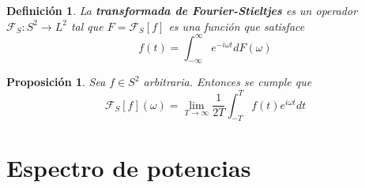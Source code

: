 \documentclass[12pt,letterpaper]{book}
\newtheorem{definicion}{Definición}[chapter]
\newtheorem{proposicion}[teorema]{Proposición}
\newcommand{\intR}{\int_{-\infty}^{\infty}}
\begin{document}
\begin{definicion}
La \textbf{transformada de Fourier-Stieltjes} es un  operador $\mathcal{F}_S:S^2\rightarrow L^2$ tal que $F = \mathcal{F}_S[f]$ es una función que satisface
\begin{equation}
f(t) = \intR e^{-i \omega t} dF(\omega)
\end{equation}
\end{definicion}

\begin{proposicion}
Sea $f \in S^2$ arbitraria. Entonces se cumple que
\begin{equation}
\mathcal{F}_S[f] (\omega) = 
\lim_{T\rightarrow\infty} \frac{1}{2T} \int_{-T}^T f(t) e^{i \omega t} dt
\end{equation}
\end{proposicion}

%



\chapter{Espectro de potencias}

%
%
\end{document}
